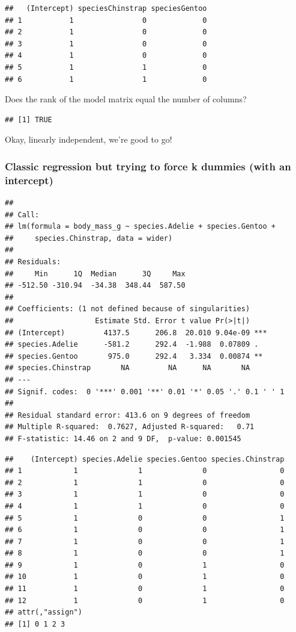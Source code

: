 \documentclass[
  openany]{book}
\begin{document}
\begin{verbatim}
##   (Intercept) speciesChinstrap speciesGentoo
## 1           1                0             0
## 2           1                0             0
## 3           1                0             0
## 4           1                0             0
## 5           1                1             0
## 6           1                1             0
\end{verbatim}

Does the rank of the model matrix equal the number of columns?

\begin{verbatim}
## [1] TRUE
\end{verbatim}

Okay, linearly independent, we're good to go!

\hypertarget{classic-regression-but-trying-to-force-k-dummies-with-an-intercept}{%
\subsubsection{Classic regression but trying to force k dummies (with an intercept)}\label{classic-regression-but-trying-to-force-k-dummies-with-an-intercept}}

\begin{verbatim}
## 
## Call:
## lm(formula = body_mass_g ~ species.Adelie + species.Gentoo + 
##     species.Chinstrap, data = wider)
## 
## Residuals:
##     Min      1Q  Median      3Q     Max 
## -512.50 -310.94  -34.38  348.44  587.50 
## 
## Coefficients: (1 not defined because of singularities)
##                   Estimate Std. Error t value Pr(>|t|)    
## (Intercept)         4137.5      206.8  20.010 9.04e-09 ***
## species.Adelie      -581.2      292.4  -1.988  0.07809 .  
## species.Gentoo       975.0      292.4   3.334  0.00874 ** 
## species.Chinstrap       NA         NA      NA       NA    
## ---
## Signif. codes:  0 '***' 0.001 '**' 0.01 '*' 0.05 '.' 0.1 ' ' 1
## 
## Residual standard error: 413.6 on 9 degrees of freedom
## Multiple R-squared:  0.7627, Adjusted R-squared:   0.71 
## F-statistic: 14.46 on 2 and 9 DF,  p-value: 0.001545
\end{verbatim}

\begin{verbatim}
##    (Intercept) species.Adelie species.Gentoo species.Chinstrap
## 1            1              1              0                 0
## 2            1              1              0                 0
## 3            1              1              0                 0
## 4            1              1              0                 0
## 5            1              0              0                 1
## 6            1              0              0                 1
## 7            1              0              0                 1
## 8            1              0              0                 1
## 9            1              0              1                 0
## 10           1              0              1                 0
## 11           1              0              1                 0
## 12           1              0              1                 0
## attr(,"assign")
## [1] 0 1 2 3
\end{verbatim}
\end{document}
